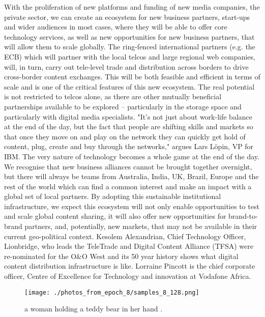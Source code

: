 \documentclass{article}%
\begin{document}
With the proliferation of new platforms and funding of new media companies, the private sector, we can create an ecosystem for new business partners, start{-}ups and wider audiences in most cases, where they will be able to offer core technology services, as well as new opportunities for new business partners, that will allow them to scale globally.\newline%
The ring{-}fenced international partners (e.g. the ECB) which will partner with the local telcos and large regional web companies, will, in turn, carry out tele{-}level trade and distribution across borders to drive cross{-}border content exchanges. This will be both feasible and efficient in terms of scale and is one of the critical features of this new ecosystem.\newline%
The real potential is not restricted to telcos alone, as there are other mutually beneficial partnerships available to be explored – particularly in the storage space and particularly with digital media specialists. "It's not just about work{-}life balance at the end of the day, but the fact that people are shifting skills and markets so that once they move on and play on the network they can quickly get hold of content, plug, create and buy through the networks," argues Lars Löpin, VP for IBM. The very nature of technology becomes a whole game at the end of the day.\newline%
We recognise that new business alliances cannot be brought together overnight, but there will always be teams from Australia, India, UK, Brazil, Europe and the rest of the world which can find a common interest and make an impact with a global set of local partners. By adopting this sustainable institutional infrastructure, we expect this ecosystem will not only enable opportunities to test and scale global content sharing, it will also offer new opportunities for brand{-}to{-}brand partners, and, potentially, new markets, that may not be available in their current geo{-}political context.\newline%
Kesolem Alexandrian, Chief Technology Officer, Lionbridge, who leads the TeleTrade and Digital Content Alliance (TFSA) were re{-}nominated for the O\&O West and its 50 year history shows what digital content distribution infrastructure is like.\newline%
Lorraine Pincott is the chief corporate officer, Centre of Excellence for Technology and innovation at Vodafone Africa.\newline%

%


\begin{figure}[h!]%
\centering%
\texttt{[image: ./photos\_from\_epoch\_8/samples\_8\_128.png]}%
\caption{a woman holding a teddy bear in her hand .}%
\end{figure}

%
\end{document}
